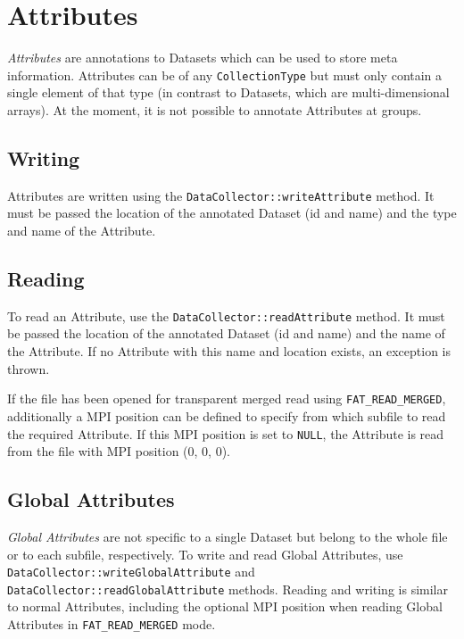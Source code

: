 \documentclass[a4paper,10pt,BCOR12mm]{report}
\newcommand{\code}[1]{\small \texttt{#1}}
\begin{document}

\section{Attributes}

\emph{Attributes} are annotations to Datasets which can be used to store meta information.
Attributes can be of any \code{CollectionType} but must only contain a single element
of that type (in contrast to Datasets, which are multi-dimensional arrays).
At the moment, it is not possible to annotate Attributes at groups.

\subsection{Writing}

Attributes are written using the \code{DataCollector::writeAttribute} method.
It must be passed the location of the annotated Dataset (id and name) and the type and
name of the Attribute.

\subsection{Reading}

To read an Attribute, use the \code{DataCollector::readAttribute} method.
It must be passed the location of the annotated Dataset (id and name) and the
name of the Attribute. If no Attribute with this name and location exists, an
exception is thrown.

If the file has been opened for transparent merged read using \code{FAT\_READ\_MERGED},
additionally a MPI position can be defined to specify from which subfile to read
the required Attribute.
If this MPI position is set to \code{NULL}, the Attribute is read from the file with
MPI position (0, 0, 0).

\subsection{Global Attributes}

\emph{Global Attributes} are not specific to a single Dataset but belong to the whole
file or to each subfile, respectively.
To write and read Global Attributes, use\\ \code{DataCollector::writeGlobalAttribute} and\\
\code{DataCollector::readGlobalAttribute} methods.
Reading and writing is similar to normal Attributes, including the optional MPI position
when reading Global Attributes in \code{FAT\_READ\_MERGED} mode.
\end{document}
